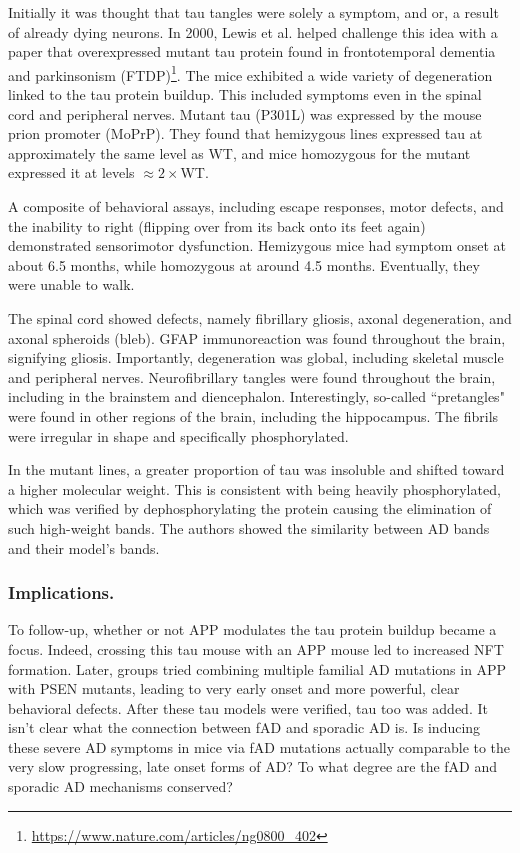  Initially it was thought that tau tangles were solely a symptom, and or, a result of already dying neurons. In 2000, Lewis et al. helped challenge this idea with a paper that overexpressed mutant tau protein found in frontotemporal dementia and parkinsonism (FTDP)\footnote{\url{https://www.nature.com/articles/ng0800_402}}. The mice exhibited a wide variety of degeneration linked to the tau protein buildup. This included symptoms even in the spinal cord and peripheral nerves. Mutant tau (P301L) was expressed by the mouse prion promoter (MoPrP). They found that hemizygous lines expressed tau at approximately the same level as WT, and mice homozygous for the mutant expressed it at levels $\approx 2\times$WT.\newline

 A composite of behavioral assays, including escape responses, motor defects, and the inability to right (flipping over from its back onto its feet again) demonstrated sensorimotor dysfunction. Hemizygous mice had symptom onset at about 6.5 months, while homozygous at around 4.5 months. Eventually, they were unable to walk. \newline

The spinal cord showed defects, namely fibrillary gliosis, axonal degeneration, and axonal spheroids (bleb). GFAP immunoreaction was found throughout the brain, signifying gliosis. Importantly, degeneration was global, including skeletal muscle and peripheral nerves. Neurofibrillary tangles were found throughout the brain, including in the brainstem and diencephalon. Interestingly, so-called ``pretangles" were found in other regions of the brain, including the hippocampus. The fibrils were irregular in shape and specifically phosphorylated.\newline

In the mutant lines, a greater proportion of tau was insoluble and shifted toward a higher molecular weight. This is consistent with being heavily phosphorylated, which was verified by dephosphorylating the protein causing the elimination of such high-weight bands. The authors showed the similarity between AD bands and their model's bands. 

\subsubsection*{Implications.}

To follow-up, whether or not APP modulates the tau protein buildup became a focus. Indeed, crossing this tau mouse with an APP mouse led to increased NFT formation. Later, groups tried combining multiple familial AD mutations in APP with PSEN mutants, leading to very early onset and more powerful, clear behavioral defects. After these tau models were verified, tau too was added. It isn't clear what the connection between fAD and sporadic AD is. Is inducing these severe AD symptoms in mice via fAD mutations actually comparable to the very slow progressing, late onset forms of AD? To what degree are the fAD and sporadic AD mechanisms conserved?\newline

